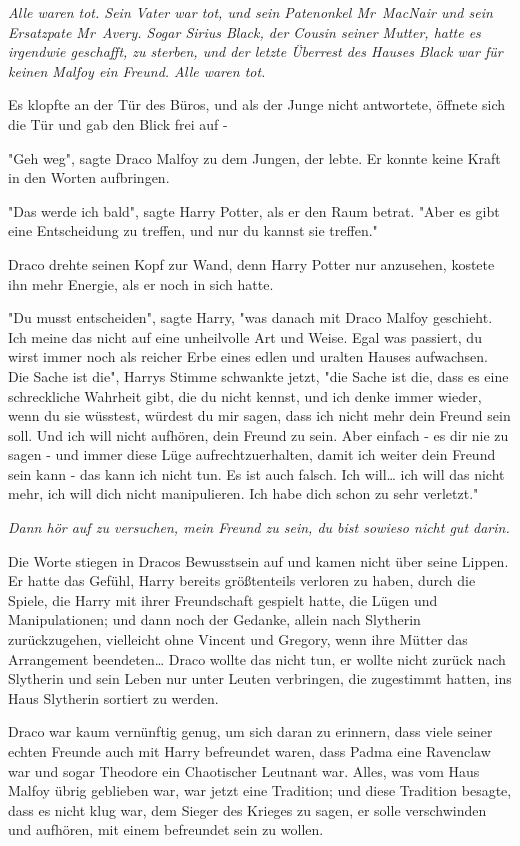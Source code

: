 {\emph{Alle waren tot. Sein Vater war tot, und sein Patenonkel Mr~MacNair und sein Ersatzpate Mr~Avery. Sogar Sirius Black, der Cousin seiner Mutter, hatte es irgendwie geschafft, zu sterben, und der letzte Überrest des Hauses Black war für keinen Malfoy ein Freund. Alle waren tot.}

Es klopfte an der Tür des Büros, und als der Junge nicht antwortete, öffnete sich die Tür und gab den Blick frei auf -

"Geh weg", sagte Draco Malfoy zu dem Jungen, der lebte. Er konnte keine Kraft in den Worten aufbringen.

"Das werde ich bald", sagte Harry Potter, als er den Raum betrat. "Aber es gibt eine Entscheidung zu treffen, und nur du kannst sie treffen."

Draco drehte seinen Kopf zur Wand, denn Harry Potter nur anzusehen, kostete ihn mehr Energie, als er noch in sich hatte.

"Du musst entscheiden", sagte Harry, "was danach mit Draco Malfoy geschieht. Ich meine das nicht auf eine unheilvolle Art und Weise. Egal was passiert, du wirst immer noch als reicher Erbe eines edlen und uralten Hauses aufwachsen. Die Sache ist die", Harrys Stimme schwankte jetzt, "die Sache ist die, dass es eine schreckliche Wahrheit gibt, die du nicht kennst, und ich denke immer wieder, wenn du sie wüsstest, würdest du mir sagen, dass ich nicht mehr dein Freund sein soll. Und ich will nicht aufhören, dein Freund zu sein. Aber einfach - es dir nie zu sagen - und immer diese Lüge aufrechtzuerhalten, damit ich weiter dein Freund sein kann - das kann ich nicht tun. Es ist auch falsch. Ich will… ich will das nicht mehr, ich will dich nicht manipulieren. Ich habe dich schon zu sehr verletzt."

\emph{Dann hör auf zu versuchen, mein Freund zu sein, du bist sowieso nicht gut darin.}

Die Worte stiegen in Dracos Bewusstsein auf und kamen nicht über seine Lippen. Er hatte das Gefühl, Harry bereits größtenteils verloren zu haben, durch die Spiele, die Harry mit ihrer Freundschaft gespielt hatte, die Lügen und Manipulationen; und dann noch der Gedanke, allein nach Slytherin zurückzugehen, vielleicht ohne Vincent und Gregory, wenn ihre Mütter das Arrangement beendeten… Draco wollte das nicht tun, er wollte nicht zurück nach Slytherin und sein Leben nur unter Leuten verbringen, die zugestimmt hatten, ins Haus Slytherin sortiert zu werden.

Draco war kaum vernünftig genug, um sich daran zu erinnern, dass viele seiner echten Freunde auch mit Harry befreundet waren, dass Padma eine Ravenclaw war und sogar Theodore ein Chaotischer Leutnant war. Alles, was vom Haus Malfoy übrig geblieben war, war jetzt eine Tradition; und diese Tradition besagte, dass es nicht klug war, dem Sieger des Krieges zu sagen, er solle verschwinden und aufhören, mit einem befreundet sein zu wollen.

}
